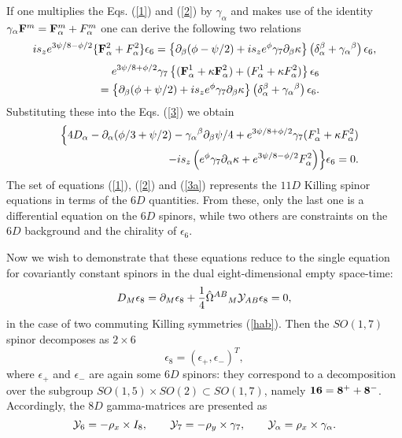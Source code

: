 \documentclass[a4paper,12pt]{article}
\begin{document}
If one multiplies the Eqs. (\ref{1}) and (\ref{2}) by
$\gamma_\alpha$ and makes use of the identity $\gamma_\alpha{\bf
F}^m = {\bf F}^m_\alpha + F^m_\alpha$ one can derive the
following two relations
\begin{equation}
i s_z e^{3\psi/8-\phi/2} \{ {\bf F}^2_\alpha + F^2_\alpha \}
\epsilon_6 = \left\{ \partial_\beta (\phi-\psi/2) + i s_z e^\phi
\gamma_7 \partial_\beta \kappa \right\} \left(
\delta_\alpha^\beta + \gamma_\alpha{}^\beta \right) \epsilon_6,
\end{equation}
\begin{eqnarray}
&& e^{3\psi/8+\phi/2} \gamma_7 \left\{ ({\bf F}^1_\alpha + \kappa
{\bf F}^2_\alpha) + (F^1_\alpha + \kappa F^2_\alpha) \right\}
\epsilon_6 \nonumber\\
&& = \left\{ \partial_\beta (\phi+\psi/2) + i s_z e^\phi \gamma_7
\partial_\beta \kappa \right\} \left( \delta_\alpha^\beta +
\gamma_\alpha{}^\beta \right) \epsilon_6.
\end{eqnarray}
Substituting these into the Eqs. (\ref{3}) we obtain
\begin{eqnarray}\label{3a}
&& \Bigl\{ 4D_\alpha - \partial_\alpha (\phi/3+\psi/2) -
\gamma_\alpha{}^\beta \partial_\beta \psi/4 + e^{3\psi/8+\phi/2}
\gamma_7 (F^1_\alpha + \kappa F^2_\alpha) \nonumber\\
&& \qquad - i s_z \left( e^\phi \gamma_7 \partial_\alpha \kappa +
e^{3\psi/8-\phi/2} F^2_\alpha \right) \Bigr\} \epsilon_6 = 0.
\end{eqnarray}
The set of equations (\ref{1}), (\ref{2}) and (\ref{3a})
represents the $11D$ Killing spinor equations in terms of the
$6D$ quantities. From these, only the last one is a differential
equation on the $6D$ spinors, while two others are constraints on
the $6D$ background and the chirality of $\epsilon_6$.

Now we wish to demonstrate that these equations reduce to the
single equation for covariantly constant spinors in the dual
eight-dimensional empty space-time:
\begin{equation}\label{8dk}
D_M \epsilon_8 = \partial_M \epsilon_8 + \frac14 \hat
\Omega^{AB}{}_M {\cal Y}_{AB} \epsilon_8 = 0,
\end{equation}
in the case of two commuting Killing symmetries (\ref{hab}).
Then the $SO(1,7)$ spinor decomposes as $2\times 6$
\begin{equation}
\epsilon_8 = (\epsilon_+, \epsilon_-)^T,
\end{equation}
where $\epsilon_{+}$ and $\epsilon_{-}$ are again some $6D$
spinors: they correspond to a decomposition over the subgroup
$SO(1,5)\times SO(2) \subset SO(1,7)$, namely $\bf 16=8^++8^-$.
Accordingly, the $8D$ gamma-matrices are presented as
\begin{equation}
{\cal Y}_6 = -\rho_x \times I_8 , \qquad {\cal Y}_7 = - \rho_y
\times \gamma_7, \qquad {\cal Y}_\alpha = \rho_x \times
\gamma_\alpha.
\end{equation}
\end{document}
